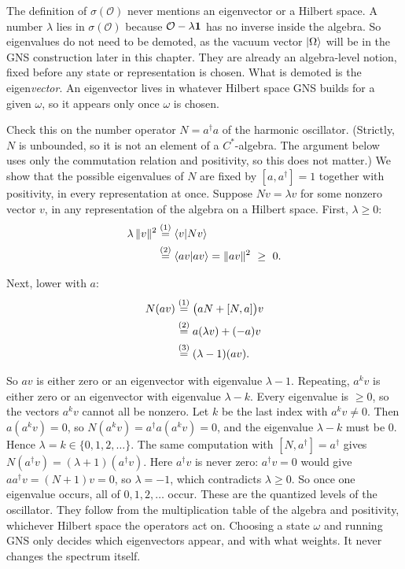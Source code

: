 \begin{physconnect}
The definition of $\sigma(\mathcal O)$ never mentions an eigenvector or a Hilbert space. A number $\lambda$
lies in $\sigma(\mathcal O)$ because $\mathcal O-\lambda\mathbf{1}$ has no inverse inside the algebra. So eigenvalues
do not need to be demoted, as the vacuum vector $\ket\Omega$ will be in the GNS construction later in this
chapter. They are already an algebra-level notion, fixed before any state or representation is chosen. What
is demoted is the eigen\emph{vector}. An eigenvector lives in whatever Hilbert space GNS builds for a given
$\omega$, so it appears only once $\omega$ is chosen.

Check this on the number operator $N=a^\dagger a$ of the harmonic oscillator. (Strictly, $N$ is unbounded, so
it is not an element of a $C^*$-algebra. The argument below uses only the commutation relation and
positivity, so this does not matter.) We show that the possible eigenvalues of $N$ are fixed by
$[a,a^\dagger]=1$ together with positivity, in every representation at once. Suppose $Nv=\lambda v$ for some
nonzero vector $v$, in any representation of the algebra on a Hilbert space. First, $\lambda\ge0$:
\begin{align}
\lambda\,\|v\|^2
&\overset{(1)}{=} \braket{v|Nv} \notag\\
&\overset{(2)}{=} \braket{av|av} = \|av\|^2 \ \ge\ 0 . \notag
\end{align}
\quad
{}

Next, lower with $a$:
\begin{align}
N(av)
&\overset{(1)}{=} \big(aN+[N,a]\big)v \notag\\
&\overset{(2)}{=} a(\lambda v) + (-a)v \notag\\
&\overset{(3)}{=} (\lambda-1)(av) . \notag
\end{align}
\quad
{}\quad
{}

So $av$ is either zero or an eigenvector with eigenvalue $\lambda-1$. Repeating, $a^kv$ is either zero or an
eigenvector with eigenvalue $\lambda-k$. Every eigenvalue is $\ge0$, so the vectors $a^kv$ cannot all be
nonzero. Let $k$ be the last index with $a^kv\ne0$. Then $a(a^kv)=0$, so $N(a^kv)=a^\dagger a(a^kv)=0$, and
the eigenvalue $\lambda-k$ must be $0$. Hence $\lambda=k\in\{0,1,2,\dots\}$. The same computation with
$[N,a^\dagger]=a^\dagger$ gives $N(a^\dagger v)=(\lambda+1)(a^\dagger v)$. Here $a^\dagger v$ is never zero:
$a^\dagger v=0$ would give $aa^\dagger v=(N+1)v=0$, so $\lambda=-1$, which contradicts $\lambda\ge0$. So once
one eigenvalue occurs, all of $0,1,2,\dots$ occur. These are the quantized levels of the oscillator. They
follow from the multiplication table of the algebra and positivity, whichever Hilbert space the operators
act on. Choosing a state $\omega$ and running GNS only decides which eigenvectors appear, and with what
weights. It never changes the spectrum itself.
\end{physconnect}

